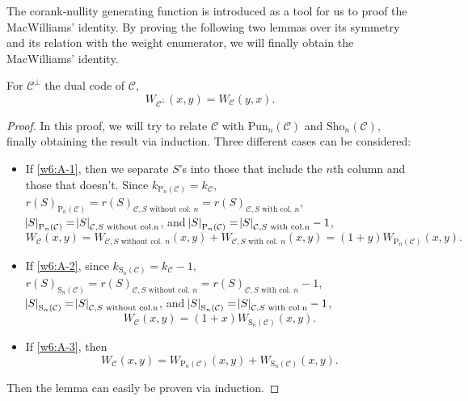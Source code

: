 The corank-nullity generating function is introduced as a tool for us to proof the MacWilliams' identity. By proving the following two lemmas over its symmetry and its relation with the weight enumerator, we will finally obtain the MacWilliams' identity.
\begin{lemma} \label{lem:w7_corank_nullity}
    For $\mathcal{C}^\perp$ the dual code of $\mathcal{C}$,
    \begin{equation}
        W_{\mathcal{C}^\perp}(x,y) = W_\mathcal{C}(y,x).
    \end{equation}
\end{lemma}
\begin{proof}
    In this proof, we will try to relate $\mathcal{C}$ with $\mathrm{Pun}_n(\mathcal{C})$ and $\mathrm{Sho}_n(\mathcal{C})$, finally obtaining the result via induction. Three different cases can be considered:
    \begin{itemize}
        \item If \ref{w6:A-1}, then we separate $S$'s into those that include the $n$th column and those that doesn't. Since $k_{\mathrm{P}_n(\mathcal{C})}=k_\mathcal{C}$, $r(S)_{\mathrm{P}_n(\mathcal{C})}=r(S)_{\mathcal{C},S \text{ without col. }n} = r(S)_{\mathcal{C},S \text{ with col. }n}$, $\abs{S}_{\mathrm{P}_n(\mathcal{C})} = \abs{S}_{\mathcal{C}, S \text{ without col.n}}$, and $\abs{S}_{\mathrm{P}_n(\mathcal{C})} = \abs{S}_{\mathcal{C}, S \text{ with col.n}} -1$,
        \begin{equation*}
            W_\mathcal{C}(x,y) = W_{\mathcal{C}, S \text{ without col. } n}(x,y) + W_{\mathcal{C}, S \text{ with col. } n}(x,y) = (1+y) W_{\mathrm{P}_n(\mathcal{C})}(x,y).
        \end{equation*}
        \item If \ref{w6:A-2}, since $k_{\mathrm{S}_n(\mathcal{C})}=k_\mathcal{C}-1$, $r(S)_{\mathrm{S}_n(\mathcal{C})}=r(S)_{\mathcal{C},S \text{ without col. }n} = r(S)_{\mathcal{C},S \text{ with col. }n}-1$, $\abs{S}_{\mathrm{S}_n(\mathcal{C})} = \abs{S}_{\mathcal{C}, S \text{ without col.n}}$, and $\abs{S}_{\mathrm{S}_n(\mathcal{C})} = \abs{S}_{\mathcal{C}, S \text{ with col.n}} -1$,
        \begin{equation*}
            W_\mathcal{C}(x,y) = (1+x) W_{\mathrm{S}_n(\mathcal{C})}(x,y).
        \end{equation*}
        \item If \ref{w6:A-3}, then
        \begin{equation*}
            W_\mathcal{C}(x,y) = W_{\mathrm{P}_n(\mathcal{C})}(x,y) + W_{\mathrm{S}_n(\mathcal{C})}(x,y).
        \end{equation*}
    \end{itemize}
    Then the lemma can easily be proven via induction.
\end{proof}
